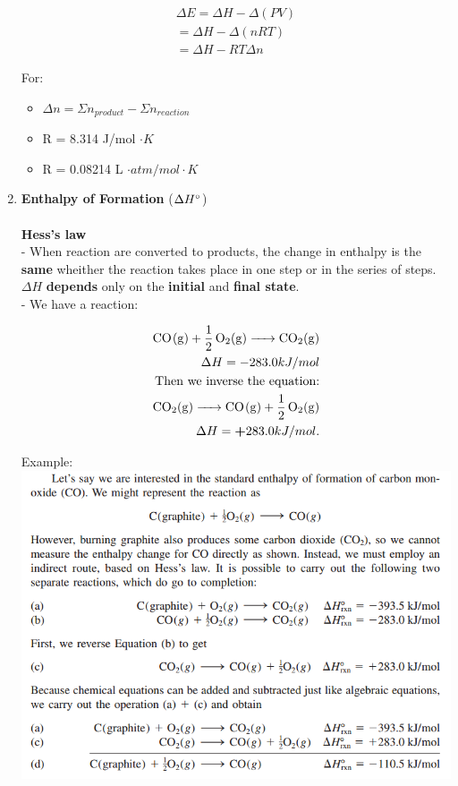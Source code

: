 \documentclass[10pt]{article}
\begin{document}
\begin{enumerate}
\begin{center}
\begin{align}
    \Delta E = \Delta H - \Delta (PV)\\
             = \Delta H - \Delta (nRT)\\
             = \Delta H - RT \Delta n
    \end{align}         
	\end{center}
	For:
	\begin{itemize}
		\item $\Delta n = \displaystyle \Sigma n_{product} - \Sigma n_{reaction}$
		\item R = 8.314 J/mol $\cdot K$
		\item R = 0.08214 L $\cdot atm/mol \cdot K$
	\end{itemize}	
	\item \textbf{Enthalpy of Formation} ($\Delta H \degree$)\\
	\\
	\textbf{Hess's law}\\
	- When reaction are converted to products, the change in enthalpy is the \textbf{same} wheither the reaction takes place in one step or in the series of steps.$\Delta H$ \textbf{depends} only on the \textbf{initial} and \textbf{final state}.\\
	- We have a reaction:\\
	\begin{center}
	\begin{align}
	\ce{CO(g) + \dfrac{1}{2} O2(g) -> CO2(g)}\\
	\Delta H = -283.0 kJ/mol\\
	\mbox{Then we inverse the equation:}\\
	\ce{CO2(g) -> CO(g) + \dfrac{1}{2} O2(g)}\\
	\Delta H = \textbf{+} 283.0 kJ/mol.
	\end{align}
	\end{center}
	Example:\\
	\includegraphics{hinh}

\end{enumerate}
\end{document}
